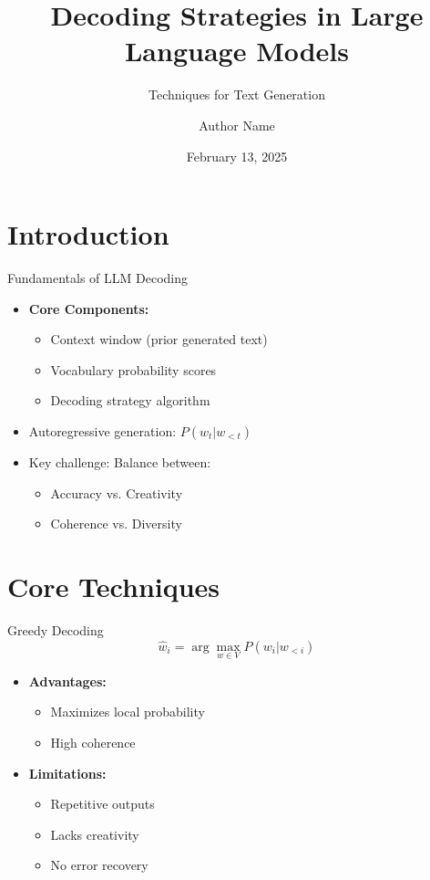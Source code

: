 \documentclass{beamer}
\title{Decoding Strategies in Large Language Models}
\subtitle{Techniques for Text Generation}
\author{Author Name}
\date{February 13, 2025}
\begin{document}
\frame{\titlepage}

\section{Introduction}

\begin{frame}{Fundamentals of LLM Decoding}
\begin{itemize}
\item \textbf{Core Components:}
\begin{itemize}
\item Context window (prior generated text)
\item Vocabulary probability scores
\item Decoding strategy algorithm
\end{itemize}
\item Autoregressive generation: $P(w_t|w_{<t})$
\item Key challenge: Balance between:
\begin{itemize}
\item Accuracy vs. Creativity
\item Coherence vs. Diversity
\end{itemize}
\end{itemize}
\end{frame}

\section{Core Techniques}

\begin{frame}{Greedy Decoding}
\[
\hat{w}_i = \arg\max_{w \in V} P(w_i|w_{<i})
\]
\begin{itemize}
\item \textbf{Advantages:}
\begin{itemize}
\item Maximizes local probability
\item High coherence
\end{itemize}
\item \textbf{Limitations:}
\begin{itemize}
\item Repetitive outputs
\item Lacks creativity
\item No error recovery
\end{itemize}
\end{itemize}
\end{frame}
\end{document}
